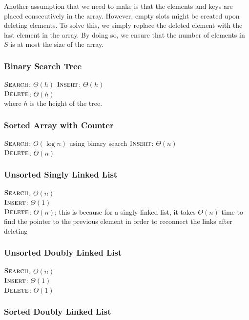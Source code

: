 Another assumption that we need to make is that the elements and keys are placed consecutively in the array. However, empty slots might be created upon deleting elements. To solve this, we simply replace the deleted element with the last element in the array. By doing so, we ensure that the number of elements in $S$ is at most the size of the array.

\subsubsection{Binary Search Tree}

$\textsc{Search}$: $\Theta(h)$
$\textsc{Insert}$: $\Theta(h)$ \\
$\textsc{Delete}$: $\Theta(h)$ \\
where $h$ is the height of the tree.

\subsubsection{Sorted Array with Counter}

$\textsc{Search}$: $O(\log n)$ using binary search
$\textsc{Insert}$: $\Theta(n)$ \\
$\textsc{Delete}$: $\Theta(n)$

\subsubsection{Unsorted Singly Linked List}

$\textsc{Search}$: $\Theta(n)$ \\
$\textsc{Insert}$: $\Theta(1)$ \\
$\textsc{Delete}$: $\Theta(n)$; this is because for a singly linked list, it takes $\Theta(n)$ time to find the pointer to the previous element in order to reconnect the links after deleting

\subsubsection{Unsorted Doubly Linked List}

$\textsc{Search}$: $\Theta(n)$ \\
$\textsc{Insert}$: $\Theta(1)$ \\
$\textsc{Delete}$: $\Theta(1)$

\subsubsection{Sorted Doubly Linked List}

